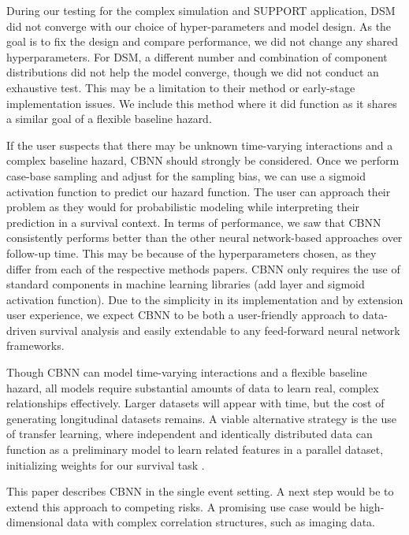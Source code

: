 \documentclass[AMA,STIX1COL,]{WileyNJD-v2}
\begin{document}
During our testing for the complex simulation and SUPPORT application,
DSM did not converge with our choice of hyper-parameters and model
design. As the goal is to fix the design and compare performance, we did
not change any shared hyperparameters. For DSM, a different number and
combination of component distributions did not help the model converge,
though we did not conduct an exhaustive test. This may be a limitation
to their method or early-stage implementation issues. We include this
method where it did function as it shares a similar goal of a flexible
baseline hazard.

If the user suspects that there may be unknown time-varying interactions
and a complex baseline hazard, CBNN should strongly be considered. Once
we perform case-base sampling and adjust for the sampling bias, we can
use a sigmoid activation function to predict our hazard function. The
user can approach their problem as they would for probabilistic modeling
while interpreting their prediction in a survival context. In terms of
performance, we saw that CBNN consistently performs better than the
other neural network-based approaches over follow-up time. This may be
because of the hyperparameters chosen, as they differ from each of the
respective methods papers. CBNN only requires the use of standard
components in machine learning libraries (add layer and sigmoid
activation function). Due to the simplicity in its implementation and by
extension user experience, we expect CBNN to be both a user-friendly
approach to data-driven survival analysis and easily extendable to any
feed-forward neural network frameworks.

Though CBNN can model time-varying interactions and a flexible baseline
hazard, all models require substantial amounts of data to learn real,
complex relationships effectively. Larger datasets will appear with
time, but the cost of generating longitudinal datasets remains. A viable
alternative strategy is the use of transfer learning, where independent
and identically distributed data can function as a preliminary model to
learn related features in a parallel dataset, initializing weights for
our survival task \citep{bozinovski2020reminder}.

This paper describes CBNN in the single event setting. A next step would
be to extend this approach to competing risks. A promising use case
would be high-dimensional data with complex correlation structures, such
as imaging data.


\end{document}

